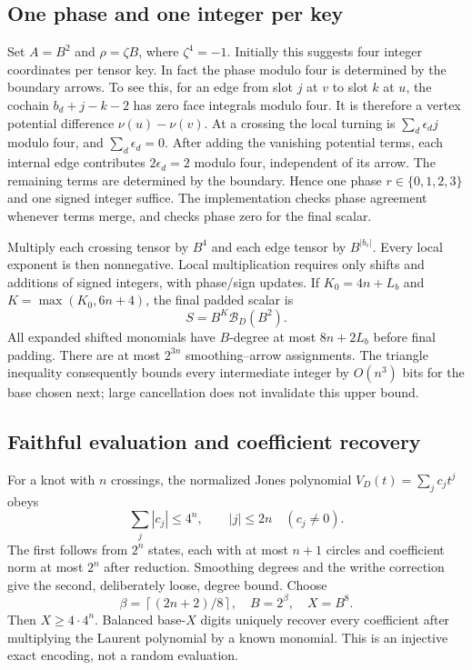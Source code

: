 \subsection{One phase and one integer per key}
Set $A=B^2$ and $\rho=\zeta B$, where $\zeta^4=-1$. Initially this suggests
four integer coordinates per tensor key. In fact the phase modulo four
is determined by the boundary arrows. To see this, for an edge from slot
$j$ at $v$ to slot $k$ at $u$, the cochain
$b_d+j-k-2$ has zero face integrals modulo four. It is therefore a vertex
potential difference $\nu(u)-\nu(v)$. At a crossing the local turning is
$\sum_d\epsilon_d j$ modulo four, and $\sum_d\epsilon_d=0$.
After adding the vanishing potential terms, each internal edge contributes
$2\epsilon_d=2$ modulo four, independent of its arrow. The remaining terms
are determined by the boundary. Hence one phase $r\in\{0,1,2,3\}$ and one
signed integer suffice. The implementation checks phase agreement whenever
terms merge, and checks phase zero for the final scalar.

Multiply each crossing tensor by $B^4$ and each edge tensor by $B^{|b_e|}$.
Every local exponent is then nonnegative. Local multiplication requires
only shifts and additions of signed integers, with phase/sign updates.
If $K_0=4n+L_b$ and $K=\max(K_0,6n+4)$, the final padded scalar is
\[
 S=B^K\mathcal B_D(B^2).
\]
All expanded shifted monomials have $B$-degree at most $8n+2L_b$ before
final padding. There are at most $2^{3n}$ smoothing--arrow assignments.
The triangle inequality consequently bounds every intermediate integer
by $O(n^3)$ bits for the base chosen next; large cancellation does not
invalidate this upper bound.

\subsection{Faithful evaluation and coefficient recovery}
For a knot with $n$ crossings, the normalized Jones polynomial
$V_D(t)=\sum_jc_jt^j$ obeys
\[
 \sum_j|c_j|\le4^n,\qquad |j|\le2n\quad(c_j\ne0).
\]
The first follows from $2^n$ states, each with at most $n+1$ circles and
coefficient norm at most $2^n$ after reduction. Smoothing degrees and the
writhe correction give the second, deliberately loose, degree bound.
Choose
\[
 \beta=\left\lceil(2n+2)/8\right\rceil,\quad B=2^\beta,\quad X=B^8.
\]
Then $X\ge4\cdot4^n$. Balanced base-$X$ digits uniquely recover every
coefficient after multiplying the Laurent polynomial by a known monomial.
This is an injective exact encoding, not a random evaluation.

